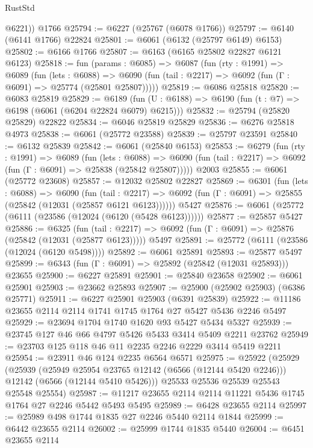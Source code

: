 \begin{lexlean}{RustStd}
\begin{coremodule}
        @6221))
    @1766
@25794 := @6227 (@25767 (@6078 @1766))
@25797 := @6140 (@6141 @1766) @22824
@25801 := @6061 (@6132 (@25797 @6149) @6153)
@25802 := @6166 @1766
@25807 := @6163 (@6165 @25802 @22827 @6121 @6123)
@25818 := fun (params : @6085) =>
  @6087
    (fun (rty : @1991) =>
    @6089
      (fun (lets : @6088) =>
      @6090 (fun (tail : @2217) => @6092 (fun (Γ : @6091) => @25774 (@25801 @25807)))))
@25819 := @6086 @25818
@25820 := @6083 @25819
@25829 := @6189
    (fun (U : @6188) => @6190 (fun (t : @7) => @6198 (@6061 (@6204 @22824 @6079) @6215)))
@25832 := @25794 (@25820 @25829) @22822
@25834 := @6046 @25819 @25829
@25836 := @6276 @25818 @4973
@25838 := @6061 (@25772 @23588)
@25839 := @25797 @23591
@25840 := @6132 @25839
@25842 := @6061 (@25840 @6153)
@25853 := @6279
    (fun (rty : @1991) =>
    @6089
      (fun (lets : @6088) =>
      @6090 (fun (tail : @2217) => @6092 (fun (Γ : @6091) => @25838 (@25842 @25807)))))
    @2003
@25855 := @6061 (@25772 @23608)
@25857 := @12032 @25802 @22827
@25869 := @6301
    (fun (lets : @6088) =>
    @6090
      (fun (tail : @2217) =>
      @6092 (fun (Γ : @6091) => @25855 (@25842 (@12031 (@25857 @6121 @6123))))))
    @5427
@25876 := @6061 (@25772 (@6111 (@23586 (@12024 (@6120 (@5428 @6123))))))
@25877 := @25857 @5427
@25886 := @6325
    (fun (tail : @2217) => @6092 (fun (Γ : @6091) => @25876 (@25842 (@12031 (@25877 @6123)))))
    @5497
@25891 := @25772 (@6111 (@23586 (@12024 (@6120 @5498))))
@25892 := @6061 @25891
@25893 := @25877 @5497
@25899 := @6343 (fun (Γ : @6091) => @25892 (@25842 (@12031 @25893))) @23655
@25900 := @6227 @25891
@25901 := @25840 @23658
@25902 := @6061 @25901
@25903 := @23662 @25893
@25907 := @25900 (@25902 @25903) (@6386 @25771)
@25911 := @6227 @25901 @25903 (@6391 @25839)
@25922 := @11186 @23655 @2114 @2114 @1741 @1745 @1764 @27 @5427 @5436 @2246 @5497
@25929 := @23694 @1704 @1740 @1620 @93 @5427 @5434 @5327
@25939 := @23745 @127 @46 @66 @4797 @5426 @5433 @3414 @5409 @2211 @23762
@25949 := @23703 @125 @118 @46 @11 @2235 @2246 @2229 @3414 @5419 @2211
@25954 := @23911 @46 @124 @2235 @6564 @6571
@25975 := @25922
    (@25929
      (@25939
        (@25949 @25954 @23765 @12142 (@6566 (@12144 @5420 @2246)))
        @12142
        (@6566 (@12144 @5410 @5426)))
      @25533
      @25536
      @25539
      @25543
      @25548
      @25554)
@25987 := @11217 @23655 @2114 @2114 @11221 @5436 @1745 @1764 @27 @2246 @5442 @5493 @5495
@25989 := @6428 @23655 @2114
@25997 := @25989 @498 @1744 @1835 @27 @2246 @5440 @2114 @1844
@25999 := @6442 @23655 @2114
@26002 := @25999 @1744 @1835 @5440
@26004 := @6451 @23655 @2114

\end{coremodule}
\end{lexlean}
